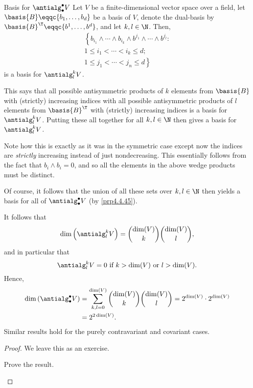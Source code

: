 \begin{prp}{Basis for $\antialg _{\bullet}^{\bullet}V$}{}
	Let $V$ be a finite-dimensional vector space over a field, let $\basis{B}\eqqc \{ b_1,\ldots ,b_d\}$ be a basis of $V$, denote the dual-basis by $\basis{B}^{\T}\eqqc \{ b^1,\ldots ,b^d\}$, and let $k,l\in \N$.  Then,
	\begin{equation}
		\begin{multlined}
			\left\{ b_{i_1}\wedge \cdots \wedge b_{i_k}\wedge b^{j_1}\wedge \cdots \wedge b^{j_l}:\right. \\ \left. 1\leq i_1<\cdots <i_k\leq d; \right. \\ \left. 1\leq j_1<\cdots <j_n\leq d\right\}
		\end{multlined}
	\end{equation}
	is a basis for $\antialg _l^kV$.
	\begin{rmk}
		This says that all possible antisymmetric products of $k$ elements from $\basis{B}$ with (strictly) increasing indices with all possible antisymmetric products of $l$ elements from $\basis{B}^{\T}$ with (strictly) increasing indices is a basis for $\antialg _l^kV$.  Putting these all together for all $k,l\in \N$ then gives a basis for $\antialg _l^kV$.
		
		Note how this is exactly as it was in the symmetric case except now the indices are \emph{strictly} increasing instead of just nondecreasing.  This essentially follows from the fact that $b_i\wedge b_i=0$, and so all the elements in the above wedge products must be distinct.
	\end{rmk}
	\begin{rmk}
		Of course, it follows that the union of all these sets over $k,l\in \N$ then yields a basis for all of $\antialg _{\bullet}^{\bullet}V$ (by \cref{prp4.4.45}).
	\end{rmk}
	\begin{rmk}
		It follows that
		\begin{equation}
			\dim \left( \antialg _l^kV\right) =\binom{\dim (V)}{k}\binom{\dim (V)}{l},
		\end{equation}
		and in particular that
		\begin{equation}
			\antialg _l^kV=0\text{ if }k>\dim (V)\text{ or }l>\dim (V)\text{.}
		\end{equation}
		Hence,
		\begin{equation}
			\begin{split}
				\dim \left( \antialg _{\bullet}^{\bullet}V\right) & =\sum _{k,l=0}^{\dim (V)}\binom{\dim (V)}{k}\binom{\dim (V)}{l}=2^{\dim (V)}\cdot 2^{\dim (V)} \\
				& =2^{2\dim (V)}.
			\end{split}
		\end{equation}
		Similar results hold for the purely contravariant and covariant cases.
	\end{rmk}
	\begin{proof}
		We leave this as an exercise.
		\begin{exr}[breakable=false]{}{}
			Prove the result.
		\end{exr}
	\end{proof}
\end{prp}
